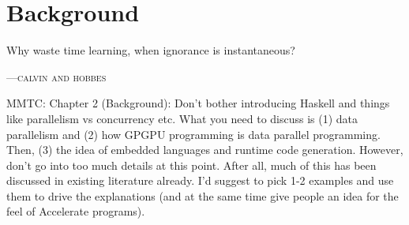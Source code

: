 %
%
%
%
%

\chapter{Background}
\epigraph{Why waste time learning, when ignorance is instantaneous?}
{\textsc{---calvin and hobbes}}
\label{ch:background}

%
%
%
%
%
%

MMTC: Chapter 2 (Background): Don't bother introducing Haskell and things like parallelism vs concurrency etc. What you need to discuss is (1) data parallelism and (2) how GPGPU programming is data parallel programming. Then, (3) the idea of embedded languages and runtime code generation. However, don't go into too much details at this point. After all, much of this has been discussed in existing literature already. I'd suggest to pick 1-2 examples and use them to drive the explanations (and at the same time give people an idea for the feel of Accelerate programs).


